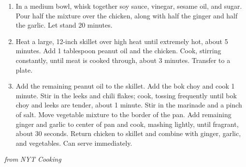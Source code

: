 \begin{enumerate}

  \item In a medium bowl, whisk together soy sauce, vinegar, sesame oil, and sugar. Pour half the mixture over the chicken, along with half the ginger and half the garlic. Let stand 20 minutes.

  \item Heat a large, 12-inch skillet over high heat until extremely hot, about 5 minutes. Add 1 tablespoon peanut oil and the chicken. Cook, stirring constantly, until meat is cooked through, about 3 minutes. Transfer to a plate.

  \item Add the remaining peanut oil to the skillet. Add the bok choy and cook 1 minute. Stir in the leeks and chili flakes; cook, tossing frequently until bok choy and leeks are tender, about 1 minute. Stir in the marinade and a pinch of salt. Move vegetable mixture to the border of the pan. Add remaining ginger and garlic to center of pan and cook, mashing lightly, until fragrant, about 30 seconds. Return chicken to skillet and combine with ginger, garlic, and vegetables. Can serve immediately. 

\end{enumerate}

\textit{ from NYT Cooking }
